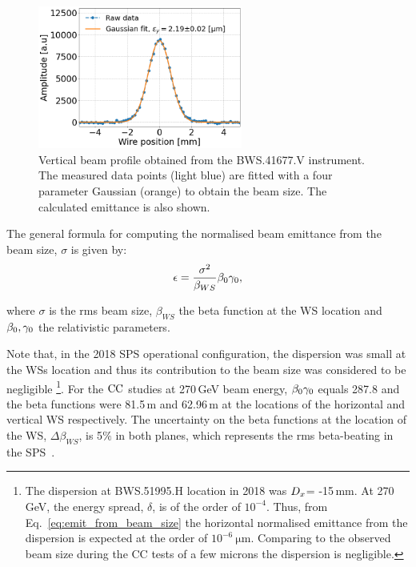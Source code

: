 \begin{figure}[!h]
   \centering         
   \includegraphics[width=0.6\textwidth]{images/Ch4/SPS.BWS.41677.V_ROT_2018-09-05 15_45_01.33500_raw_and_fit.png}
       \caption{Vertical beam profile obtained from the BWS.41677.V instrument. The measured data points (light blue) are fitted with a four parameter Gaussian (orange) to obtain the beam size. The calculated emittance is also shown.}
       \label{fig:WS_example_V_profile}
\end{figure}
   

The general formula for computing the normalised beam emittance from the beam size, $\sigma$ is given by:
\begin{equation}\label{eq:emittance_from_WS}
   \centering
   \epsilon = \frac{\sigma^2}{\beta_{WS}} \betarel \gammarel ,
\end{equation}

where $\sigma$ is the rms beam size, $\beta_{WS}$ the beta function at the WS location and ${\beta_0}, {\gamma_0}$ the relativistic parameters.


Note that, in the 2018 SPS operational configuration, the dispersion was small at the WSs location and thus its contribution to the beam size was considered to be negligible \footnote{The dispersion at BWS.51995.H location in 2018 was ${D_x}$= -15\,mm. At 270\,GeV, the energy spread, $\delta$, is of the order of $\mathrm{10^{-4}}$. Thus, from Eq.~\eqref{eq:emit_from_beam_size} the horizontal normalised emittance from the dispersion is expected at the order of $\mathrm{10^{-6} \ \mu m}$. Comparing to the observed beam size during the CC tests of a few microns the dispersion is negligible. \color{red}{The measured $\Dx, \Dy$ were found to be very small and thus their contribution is also considered negligible. The plan is to perform some measurments in 2022 to get a feeling of their values at the location of the wire scanners}}. For the ${\mathrm{CC}}$ studies at 270\,GeV beam energy, ${\beta_0} {\gamma_0}$ equals 287.8 and the beta functions were 81.5\,m and 62.96\,m at the locations of the horizontal and vertical WS respectively. The uncertainty on the beta functions at the location of the WS, $\Delta \beta_{WS}$, is 5$\%$ in both planes, which represents the rms beta-beating in the SPS~\cite{SPS-beta-beating-Rogelio}.

